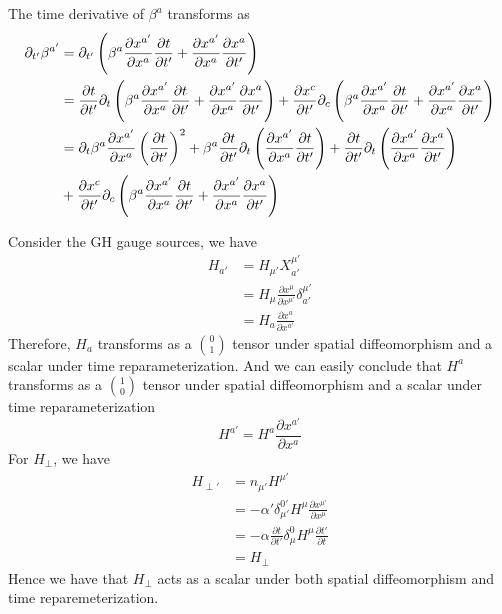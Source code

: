 \documentclass[letterpaper,nofootinbib,prd,amsmath,onecolumn]{revtex4-1}
\begin{document}
The time derivative of $\beta^{a}$ transforms as
\begin{align}
\partial_{t'}\beta^{a'} & = \partial_{t'}\left(\beta^{a}\frac{\partial x^{a'}}{\partial x^{a}}\frac{\partial t}{\partial t'} + \frac{\partial x^{a'}}{\partial x^{a}}\frac{\partial x^{a}}{\partial t'}\right)\notag\\
& = \frac{\partial t}{\partial t'}\partial_{t}\left(\beta^{a}\frac{\partial x^{a'}}{\partial x^{a}}\frac{\partial t}{\partial t'} + \frac{\partial x^{a'}}{\partial x^{a}}\frac{\partial x^{a}}{\partial t'}\right) + \frac{\partial x^{c}}{\partial t'}\partial_{c}\left(\beta^{a}\frac{\partial x^{a'}}{\partial x^{a}}\frac{\partial t}{\partial t'} + \frac{\partial x^{a'}}{\partial x^{a}}\frac{\partial x^{a}}{\partial t'}\right)\notag\\
& = \partial_{t}\beta^{a}\frac{\partial x^{a'}}{\partial x^{a}}\left(\frac{\partial t}{\partial t'}\right)^{2} + \beta^{a}\frac{\partial t}{\partial t'}\partial_{t}\left(\frac{\partial x^{a'}}{\partial x^{a}}\frac{\partial t}{\partial t'}\right) + \frac{\partial t}{\partial t'}\partial_{t}\left(\frac{\partial x^{a'}}{\partial x^{a}}\frac{\partial x^{a}}{\partial t'}\right)\notag\\
& + \frac{\partial x^{c}}{\partial t'}\partial_{c}\left(\beta^{a}\frac{\partial x^{a'}}{\partial x^{a}}\frac{\partial t}{\partial t'} + \frac{\partial x^{a'}}{\partial x^{a}}\frac{\partial x^{a}}{\partial t'}\right)
\end{align}

Consider the GH gauge sources, we have
\begin{align}
H_{a'} & = H_{\mu'}X^{\mu'}_{a'}\\
& = H_{\mu}\frac{\partial x^{\mu}}{\partial x^{\mu'}}\delta^{\mu'}_{a'}\\
& = H_{a}\frac{\partial x^{a}}{\partial x^{a'}}
\end{align}
Therefore, $H_{a}$ transforms as a $0 \choose 1$ tensor under spatial diffeomorphism and a scalar under time reparameterization. And we can easily conclude that $H^{a}$ transforms as a $1 \choose 0$ tensor under spatial diffeomorphism and a scalar under time reparameterization
\begin{equation}
H^{a'} = H^{a}\frac{\partial x^{a'}}{\partial x^{a}}
\end{equation}
For $H_{\perp}$, we have
\begin{align}
H_{\perp'} & = n_{\mu'}H^{\mu'}\\
& = - \alpha' \delta^{0'}_{\mu'}H^{\mu}\frac{\partial x^{\mu'}}{\partial x^{\mu}}\\
& = - \alpha\frac{\partial t}{\partial t'}\delta^{0}_{\mu}H^{\mu}\frac{\partial t'}{\partial t}\\
& = H_{\perp}
\end{align}
Hence we have that $H_{\perp}$ acts as a scalar under both spatial diffeomorphism and time reparemeterization. 
\end{document}
